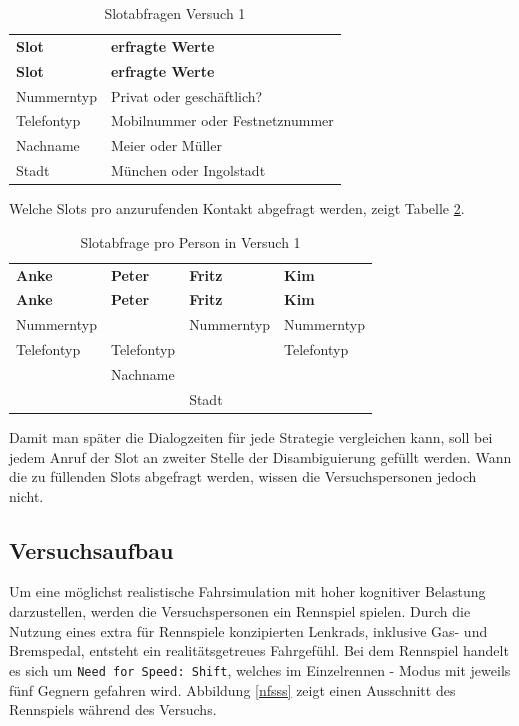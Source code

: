\documentclass[12pt,a4paper]{scrartcl}
\begin{document}
\begin{longtable}{p{6cm}p{8cm}}
	\label{slots}\\
	\caption[Slotabfragen Versuch 1]{Slotabfragen Versuch 1}\\
	\hline
	\textbf{Slot} &	\textbf{erfragte Werte}\\
	\hline
	\endfirsthead
	\hline
	\textbf{Slot} &	\textbf{erfragte Werte}\\
	\hline
	\endhead
Nummerntyp & Privat oder geschäftlich?\\
Telefontyp & Mobilnummer oder Festnetznummer\\
Nachname & Meier oder Müller\\
Stadt & München oder Ingolstadt\\


\hline
\end{longtable}
\newpage
Welche Slots pro anzurufenden Kontakt abgefragt werden, zeigt Tabelle \ref{slotsPerson}. 

\begin{longtable}{p{}p{}p{}p{}}
	\label{slotsPerson}\\
	\caption[Slotabfrage pro Person in Versuch 1]{Slotabfrage pro Person in Versuch 1}\\
	\hline
	\textbf{Anke}&\textbf{Peter}&\textbf{Fritz} &\textbf{Kim}\\
	\hline
	\endfirsthead
	\hline
	\textbf{Anke}&\textbf{Peter}&\textbf{Fritz} &\textbf{Kim}\\
	\hline
	\endhead
Nummerntyp & & Nummerntyp & Nummerntyp\\
Telefontyp & Telefontyp & & Telefontyp \\
& Nachname & & \\
& & Stadt & \\

\hline
\end{longtable}

Damit man später die Dialogzeiten für jede Strategie vergleichen kann, soll bei jedem Anruf der Slot an zweiter Stelle der Disambiguierung gefüllt werden. Wann die zu füllenden Slots abgefragt werden, wissen die Versuchspersonen jedoch nicht.  

\subsection{Versuchsaufbau}
Um eine möglichst realistische Fahrsimulation mit hoher kognitiver Belastung darzustellen, werden die Versuchspersonen ein Rennspiel spielen. Durch die Nutzung eines extra für Rennspiele konzipierten Lenkrads, inklusive Gas- und Bremspedal, entsteht ein realitätsgetreues Fahrgefühl. Bei dem Rennspiel handelt es sich um \texttt{Need for Speed: Shift}, welches im Einzelrennen - Modus mit jeweils fünf Gegnern gefahren wird. Abbildung \ref{nfsss} zeigt einen Ausschnitt des Rennspiels während des Versuchs. 
\end{document}
